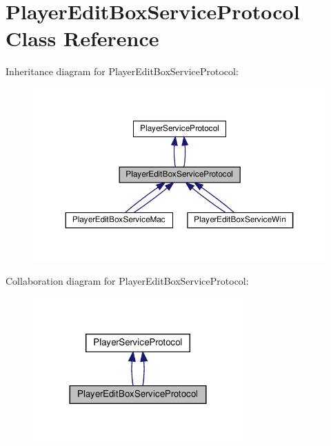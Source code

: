 \hypertarget{classPlayerEditBoxServiceProtocol}{}\section{Player\+Edit\+Box\+Service\+Protocol Class Reference}
\label{classPlayerEditBoxServiceProtocol}


Inheritance diagram for Player\+Edit\+Box\+Service\+Protocol\+:
\nopagebreak
\begin{figure}[H]
\begin{center}
\leavevmode
\includegraphics[width=350pt]{classPlayerEditBoxServiceProtocol__inherit__graph}
\end{center}
\end{figure}


Collaboration diagram for Player\+Edit\+Box\+Service\+Protocol\+:
\nopagebreak
\begin{figure}[H]
\begin{center}
\leavevmode
\includegraphics[width=228pt]{classPlayerEditBoxServiceProtocol__coll__graph}
\end{center}
\end{figure}
